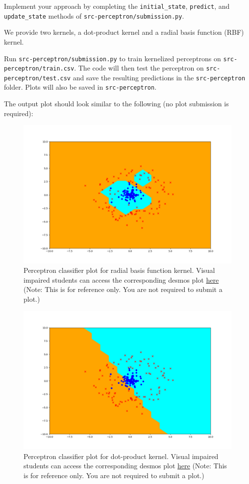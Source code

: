 \item {} Implement your approach by completing the
\texttt{initial\_state}, \texttt{predict}, and \texttt{update\_state} methods
of \texttt{src-perceptron/submission.py}.


We provide two kernels, a dot-product kernel and a
radial basis function (RBF) kernel. 

Run \texttt{src-perceptron/submission.py} to train
kernelized perceptrons on \texttt{src-perceptron/train.csv}. The code will then test
the perceptron on \texttt{src-perceptron/test.csv} and save the resulting
predictions in the \texttt{src-perceptron} folder. Plots will also be saved in
\texttt{src-perceptron}.

The output plot should look similar to the following (no plot submission is required):
\begin{figure}[H]
	\centering
	\vspace{2mm}
	\includegraphics[width=0.65\linewidth]{03-perceptron/perceptron_rbf_output.png}
    \caption{Perceptron classifier plot for radial basis function kernel. Visual impaired students can access the corresponding desmos plot \href{https://www.desmos.com/calculator/2nmxccaguj}{here} (Note: This is for reference only. You are not required to submit a plot.)}
\end{figure}

\begin{figure}[H]
	\centering
	\vspace{2mm}
	\includegraphics[width=0.65\linewidth]{03-perceptron/perceptron_dot_output.png}
    \caption{Perceptron classifier plot for dot-product kernel. Visual impaired students can access the corresponding desmos plot \href{https://www.desmos.com/calculator/j4lbbo3kyu}{here} (Note: This is for reference only. You are not required to submit a plot.)}
\end{figure}